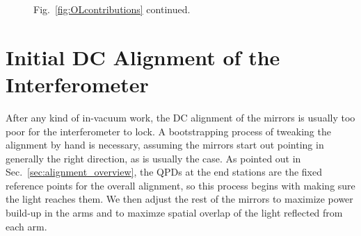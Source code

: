 \begin{figure}
\begin{centering}
Fig.~\ref{fig:OLcontributions} continued.
\end{centering}
\end{figure}



\section{Initial DC Alignment of the Interferometer}
\label{sec:initial_alignment}
After any kind of in-vacuum work, the DC alignment of the mirrors is
usually too poor for the interferometer to lock. A bootstrapping
process of tweaking the alignment by hand is necessary, assuming the
mirrors start out pointing in generally the right direction, as is
usually the case. As pointed out in Sec.~\ref{sec:alignment_overview}, the
QPDs at the end stations are the fixed reference points for the
overall alignment, so this process begins with making sure the light
reaches them. We then adjust the rest of the mirrors to maximize power
build-up in the arms and to maximze spatial overlap of the light
reflected from each arm.

